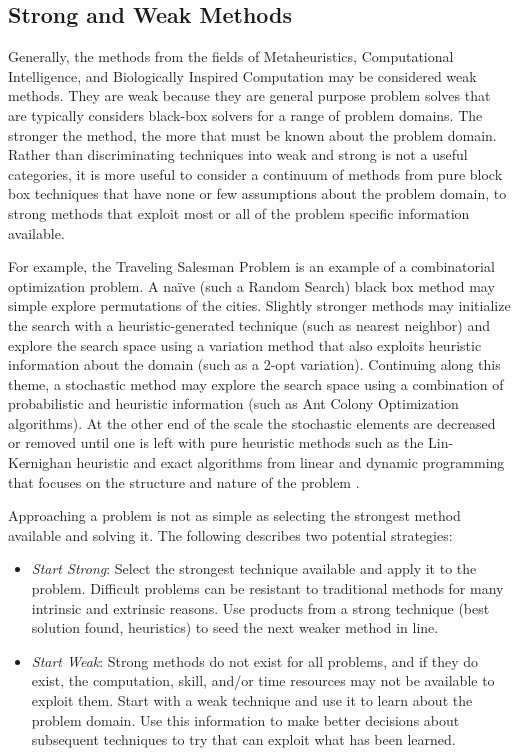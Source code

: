 \subsection{Strong and Weak Methods}
\label{sec:strong_methods}
Generally, the methods from the fields of Metaheuristics, Computational Intelligence, and Biologically Inspired Computation may be considered weak methods. They are weak because they are general purpose problem solves that are typically considers black-box solvers for a range of problem domains. The stronger the method, the more that must be known about the problem domain.
Rather than discriminating techniques into weak and strong is not a useful categories, it is more useful to consider a continuum of methods from pure block box techniques that have none or few assumptions about the problem domain, to strong methods that exploit most or all of the problem specific information available.

For example, the Traveling Salesman Problem is an example of a combinatorial optimization problem. A na\"ive (such a Random Search) black box method may simple explore permutations of the cities. Slightly stronger methods may initialize the search with a heuristic-generated technique (such as nearest neighbor) and explore the search space using a variation method that also exploits heuristic information about the domain (such as a 2-opt variation). Continuing along this theme, a stochastic method may explore the search space using a combination of probabilistic and heuristic information (such as Ant Colony Optimization algorithms). At the other end of the scale the stochastic elements are decreased or removed until one is left with pure heuristic methods such as  the Lin-Kernighan heuristic \cite{Lin1973} and exact algorithms from linear and dynamic programming that focuses on the structure and nature of the problem \cite{Woeginger2003}.

Approaching a problem is not as simple as selecting the strongest method available and solving it. The following describes two potential strategies:

\begin{itemize}
  \item \emph{Start Strong}: Select the strongest technique available and apply it to the problem. Difficult problems can be resistant to traditional methods for many intrinsic and extrinsic reasons. Use products from a strong technique (best solution found, heuristics) to seed the next weaker method in line. 
  \item \emph{Start Weak}: Strong methods do not exist for all problems, and if they do exist, the computation, skill, and/or time resources may not be available to exploit them. Start with a weak technique and use it to learn about the problem domain. Use this information to make better decisions about subsequent techniques to try that can exploit what has been learned.
\end{itemize}

